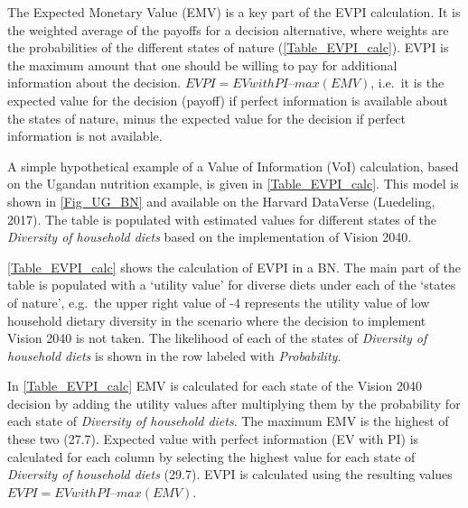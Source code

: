 \documentclass[
]{article}
\begin{document}
The Expected Monetary Value (EMV) is a key part of the EVPI calculation.
It is the weighted average of the payoffs for a decision alternative,
where weights are the probabilities of the different states of nature
(\autoref{Table_EVPI_calc}). EVPI is the maximum amount that one should
be willing to pay for additional information about the decision.
\(EVPI = EV with PI – max(EMV)\), i.e.~it is the expected value for the
decision (payoff) if perfect information is available about the states
of nature, minus the expected value for the decision if perfect
information is not available.

A simple hypothetical example of a Value of Information (VoI)
calculation, based on the Ugandan nutrition example, is given in
\autoref{Table_EVPI_calc}. This model is shown in \autoref{Fig_UG_BN}
and available on the Harvard DataVerse (Luedeling, 2017). The table is
populated with estimated values for different states of the
\emph{Diversity of household diets} based on the implementation of
Vision 2040.

\autoref{Table_EVPI_calc} shows the calculation of EVPI in a BN. The
main part of the table is populated with a `utility value' for diverse
diets under each of the `states of nature', e.g.~the upper right value
of -4 represents the utility value of low household dietary diversity in
the scenario where the decision to implement Vision 2040 is not taken.
The likelihood of each of the states of \emph{Diversity of household
diets} is shown in the row labeled with \emph{Probability}.

In \autoref{Table_EVPI_calc} EMV is calculated for each state of the
Vision 2040 decision by adding the utility values after multiplying them
by the probability for each state of \emph{Diversity of household
diets}. The maximum EMV is the highest of these two (27.7). Expected
value with perfect information (EV with PI) is calculated for each
column by selecting the highest value for each state of \emph{Diversity
of household diets} (29.7). EVPI is calculated using the resulting
values \(EVPI = EV with PI – max(EMV)\).
\end{document}
